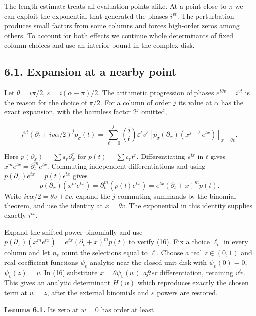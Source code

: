 \documentclass[11pt,a4paper]{article}
\begin{document}
The length estimate treats all evaluation points alike. At a point close to \(\pi\) we can exploit the exponential that generated the phases \(i^{vt}\). The perturbation produces small factors from some columns and forces high-order zeros among others. To account for both effects we continue whole determinants of fixed column choices and use an interior bound in the complex disk.

\subsection{6.1. Expansion at a nearby point}\label{expansion-at-a-nearby-point}

Let \(\theta=i\pi/2\), \(\varepsilon=i(\alpha-\pi)/2\). The arithmetic progression of phases \(e^{t\theta v}=i^{vt}\) is the reason for the choice of \(\pi/2\). For a column of order \(j\) its value at \(\alpha\) has the exact expansion, with the harmless factor \(2^j\) omitted,

\[
 i^{vt}(\partial_t+iv\alpha/2)^jp_\sigma(t)
 =\sum_{\ell=0}^j\binom j\ell\varepsilon^\ell v^\ell
      [p_\sigma(\partial_x)(x^{j-\ell}e^{tx})]_{x=\theta v}.              \tag{16}\label{eq:16}
\]

Here \(p(\partial_x)=\sum a_r\partial_x^r\) for \(p(t)=\sum a_rt^r\). Differentiating \(e^{tx}\) in \(t\) gives \(x^me^{tx}=\partial_t^m e^{tx}\). Commuting independent differentiations and using \(p(\partial_x)e^{tx}=p(t)e^{tx}\) gives \[
 p(\partial_x)(x^me^{tx})=\partial_t^m(p(t)e^{tx})
 =e^{tx}(\partial_t+x)^mp(t).
\] Write \(iv\alpha/2=\theta v+\varepsilon v\), expand the \(j\) commuting summands by the binomial theorem, and use the identity at \(x=\theta v\). The exponential in this identity supplies exactly \(i^{vt}\).

Expand the shifted power binomially and use \(p(\partial_x)(x^m e^{tx})=e^{tx}(\partial_t+x)^mp(t)\) to verify \hyperref[eq:16]{(16)}. Fix a choice \(\ell_c\) in every column and let \(n_\ell\) count the selections equal to \(\ell\). Choose a real \(z\in(0,1)\) and real-coefficient functions \(\psi_v\) analytic near the closed unit disk with \(\psi_v(0)=0\), \(\psi_v(z)=v\). In \hyperref[eq:16]{(16)} substitute \(x=\theta\psi_v(w)\) \emph{after} differentiation, retaining \(v^{\ell_c}\). This gives an analytic determinant \(H(w)\) which reproduces exactly the chosen term at \(w=z\), after the external binomials and \(\varepsilon\) powers are restored.

\textbf{Lemma 6.1.} Its zero at \(w=0\) has order at least
\end{document}
